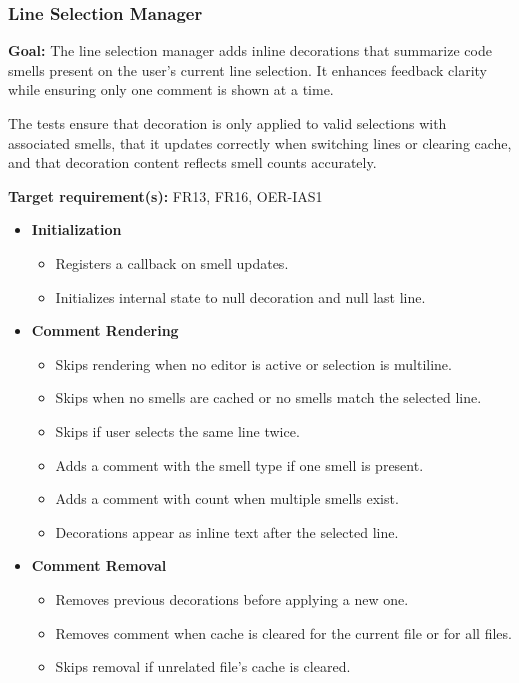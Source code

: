 \documentclass[12pt, titlepage]{article}
\begin{document}
\subsubsection{Line Selection Manager}

\textbf{Goal:} The line selection manager adds inline decorations that summarize code smells present on the user's current line selection. It enhances feedback clarity while ensuring only one comment is shown at a time.

\medskip

\noindent The tests ensure that decoration is only applied to valid selections with associated smells, that it updates correctly when switching lines or clearing cache, and that decoration content reflects smell counts accurately.

\medskip

\noindent\textbf{Target requirement(s):} FR13, FR16, OER-IAS1~\cite{SRS}

\begin{itemize}
  \item \textbf{Initialization}
    \begin{itemize}
      \item Registers a callback on smell updates.
      \item Initializes internal state to null decoration and null last line.
    \end{itemize}

  \item \textbf{Comment Rendering}
    \begin{itemize}
      \item Skips rendering when no editor is active or selection is multiline.
      \item Skips when no smells are cached or no smells match the selected line.
      \item Skips if user selects the same line twice.
      \item Adds a comment with the smell type if one smell is present.
      \item Adds a comment with count when multiple smells exist.
      \item Decorations appear as inline text after the selected line.
    \end{itemize}

  \item \textbf{Comment Removal}
    \begin{itemize}
      \item Removes previous decorations before applying a new one.
      \item Removes comment when cache is cleared for the current file or for all files.
      \item Skips removal if unrelated file’s cache is cleared.
    \end{itemize}
\end{itemize}
\end{document}
